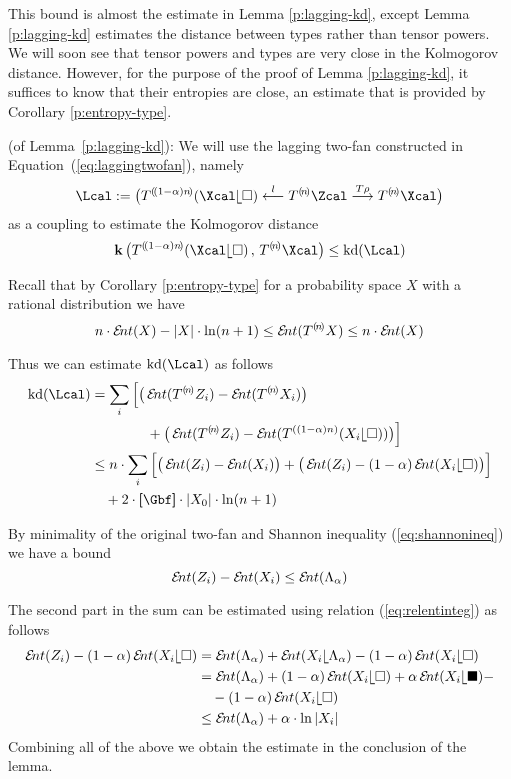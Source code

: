  This bound is almost the estimate in Lemma \ref{p:lagging-kd},
  except Lemma \ref{p:lagging-kd} estimates the distance between types
  rather than tensor powers. We will soon see that tensor powers and
  types are very close in the Kolmogorov distance. However, for the
  purpose of the proof of Lemma \ref{p:lagging-kd}, it suffices to
  know that their entropies are close, an estimate that is provided by
  Corollary \ref{p:entropy-type}.

\medskip
{} (of Lemma~\ref{p:lagging-kd}): 
  We will use the lagging two-fan constructed in
  Equation~(\ref{eq:laggingtwofan}), namely
  \[
    \Lcal
    :=
    \big(
    T^{\c{(1-\alpha) n}}(\Xcal\rel\square)
    \oot[l]
    T^{\c{n}}\Zcal
    \too[T\rho]
    T^{\c{n}}\Xcal 
    \big)
  \]
  as a coupling to estimate the Kolmogorov distance
  \[
    \ikd\big(T^{\c{(1-\alpha) n}}(\Xcal\rel\square)\,,\,
    T^{\c{n}}\Xcal\big)
    \leq
    \kd(\Lcal)
  \]
	
  Recall that by Corollary \ref{p:entropy-type} for a probability
  space $X$ with a rational distribution we have
  \[  
    n \cdot\ent(X) - |X| \cdot \ln (n+1) 
    \leq 
    \ent(T^{\c n} X) \leq n \cdot\ent(X)
  \]  
  
  Thus we can estimate $\kd(\Lcal)$ as follows
  \begin{align*}
    \kd(\Lcal)
    &=
    \sum_{i}
    \Big[
      \big(
      \ent(T^{\c n}Z_{i}) 
      - 
      \ent(T^{\c{n}} X_{i})
      \big)
      \\
      &\qquad \qquad +  
      \big(
      \ent(T^{\c n}Z_{i}) 
      - 
      \ent(T^{((1-\alpha)n)} (X_{i}\rel\square))
      \big)
    \Big]
    \\
    &\leq
    n\cdot
    \sum_{i}
    \Big[
      \big(
      \ent(Z_{i}) 
      - 
      \ent(X_{i})
      \big)
      +
      \big(
      \ent(Z_{i}) 
      - 
      (1-\alpha)\ent(X_{i}\rel\square)
      \big)
    \Big] 
    \\
    &\quad + 
    2 \cdot \size{\Gbf}\cdot |X_0|\cdot\ln(n+1) 
  \end{align*}
     
  By minimality of the original two-fan and Shannon inequality
  (\ref{eq:shannonineq}) we have a bound
  \[
    \ent(Z_{i}) - \ent(X_{i}) 
    \leq
    \ent(\Lambda_\alpha)
  \]
	
  The second part in the sum can be estimated using relation
  (\ref{eq:relentinteg}) as follows
  \begin{align*}
    \ent(Z_{i}) - (1-\alpha)\ent(X_{i}\rel\square)
    &=
    \ent(\Lambda_\alpha) + 
    \ent(X_{i}\rel\Lambda_\alpha) - 
    (1-\alpha)\ent(X_{i}\rel\square)
    \\
    &=
    \ent(\Lambda_\alpha) + 
    (1-\alpha)\ent(X_{i}\rel\square) + 
    \alpha\Ent(X_{i}\rel\blacksquare) -
    \\
    &\quad-
    (1-\alpha)\ent(X_{i}\rel\square)
    \\
    &\leq
    \ent(\Lambda_\alpha)
    +
    \alpha\cdot\ln|X_{i}|
  \end{align*}
  Combining all of the above we obtain the estimate in the conclusion
  of the lemma.  
\eproof

